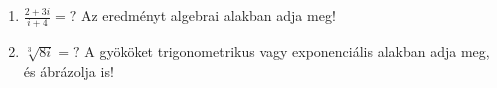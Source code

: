 \documentclass[11pt]{scrartcl}
\begin{document}
\begin{enumerate}
	\item \(\displaystyle
	      \frac{2 + 3i}{i + 4} = ?
	      \) Az eredményt algebrai alakban adja meg!

	\item $\sqrt[3]{8i} = ?$ A gyököket trigonometrikus vagy exponenciális
	      alakban adja meg, és ábrázolja is!
\end{enumerate}
\end{document}
